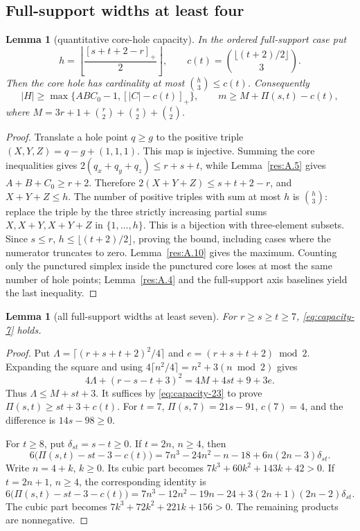 \documentclass[11pt]{article}
\newtheorem{lemma}[theorem]{Lemma}
\theoremstyle{definition}
\theoremstyle{remark}
\theoremstyle{plain}
\begin{document}
\subsection{Full-support widths at least four}
\begin{lemma}[quantitative core-hole capacity]\label{res:A.30} In the ordered full-support case put
\[
h=\left\lfloor\frac{[s+t+2-r]_+}{2}\right\rfloor,
\qquad c(t)=\binom{\lfloor(t+2)/2\rfloor}{3}.
\]
Then the core hole has cardinality at most \(\binom h3\le c(t)\). Consequently
\[
|H|\ge\max\{ABC_0-1,[|C|-c(t)]_+\},\qquad
m\ge M+\Pi(s,t)-c(t), \tag{3.23}\label{eq:capacity-23}
\]
where \(M=3r+1+\binom r2+\binom s2+\binom t2\).
\end{lemma}
\begin{proof} Translate a hole point \(q\ge g\) to the positive triple \((X,Y,Z)=q-g+(1,1,1)\). This map is injective. Summing the core inequalities gives \(2(q_x+q_y+q_z)\le r+s+t\), while Lemma~\ref{res:A.5} gives \(A+B+C_0\ge r+2\). Therefore \(2(X+Y+Z)\le s+t+2-r\), and \(X+Y+Z\le h\). The number of positive triples with sum at most \(h\) is \(\binom h3\): replace the triple by the three strictly increasing partial sums \(X,X+Y,X+Y+Z\) in \(\{1,\ldots,h\}\). This is a bijection with three-element subsets. Since \(s\le r\), \(h\le\lfloor(t+2)/2\rfloor\), proving the bound, including cases where the numerator truncates to zero. Lemma~\ref{res:A.10} gives the maximum. Counting only the punctured simplex inside the punctured core loses at most the same number of hole points; Lemma~\ref{res:A.4} and the full-support axis baselines yield the last inequality. \end{proof}

\begin{lemma}[all full-support widths at least seven]\label{res:A.31} For \(r\ge s\ge t\ge7\), \eqref{eq:capacity-7} holds.
\end{lemma}
\begin{proof} Put \(\Lambda=\lceil(r+s+t+2)^2/4\rceil\) and \(e=(r+s+t+2)\bmod2\). Expanding the square and using \(4\lceil n^2/4\rceil=n^2+3(n\bmod2)\) gives
\[
4\Lambda+(r-s-t+3)^2=4M+4st+9+3e.
\]
Thus \(\Lambda\le M+st+3\). It suffices by \eqref{eq:capacity-23} to prove \(\Pi(s,t)\ge st+3+c(t)\). For \(t=7\), \(\Pi(s,7)=21s-91\), \(c(7)=4\), and the difference is \(14s-98\ge0\).

For \(t\ge8\), put \(\delta_{st}=s-t\ge0\). If \(t=2n\), \(n\ge4\), then
\[
6\big(\Pi(s,t)-st-3-c(t)\big)
=7n^3-24n^2-n-18+6n(2n-3)\delta_{st}.
\]
Write \(n=4+k\), \(k\ge0\). Its cubic part becomes \(7k^3+60k^2+143k+42>0\). If \(t=2n+1\), \(n\ge4\), the corresponding identity is
\[
6\big(\Pi(s,t)-st-3-c(t)\big)
=7n^3-12n^2-19n-24+3(2n+1)(2n-2)\delta_{st}.
\]
The cubic part becomes \(7k^3+72k^2+221k+156>0\). The remaining products are nonnegative. \end{proof}
\end{document}
